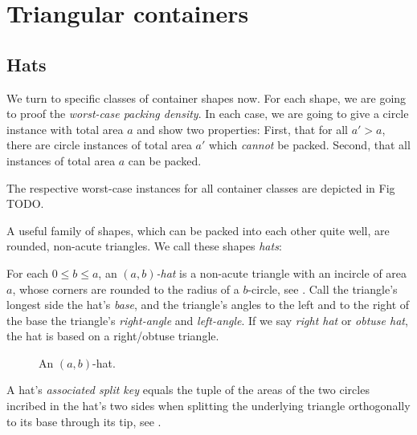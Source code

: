 \chapter{Triangular containers}

\section{Hats}

We turn to specific classes of container shapes now. For each shape, we are going to proof the \emph{worst-case packing density}. In each case, we are going to give a circle instance with total area $a$ and show two properties: First, that for all $a' > a$, there are circle instances of total area $a'$ which \emph{cannot} be packed. Second, that all instances of total area $a$ can be packed.

The respective worst-case instances for all container classes are depicted in Fig TODO.

A useful family of shapes, which can be packed into each other quite well, are rounded, non-acute triangles. We call these shapes \emph{hats}:

\begin{definition}
    For each $0 \le b \le a$, an \emph{$(a,b)$-hat} is a non-acute triangle with an incircle of area $a$, whose corners are rounded to the radius of a $b$-circle, see . Call the triangle's longest side the hat's \emph{base}, and the triangle's angles to the left and to the right of the base the triangle's \emph{right-angle} and \emph{left-angle}.
    If we say \emph{right hat} or \emph{obtuse hat}, the hat is based on a right/obtuse triangle.
\end{definition}

\begin{figure}[htbp!]
    \centering


    \caption{An $(a,b)$-hat.}
    \label{fig:hat}
\end{figure}

\begin{definition}\label{def:hat-split-key}
    A hat's \emph{associated split key} equals the tuple of the areas of the two circles incribed in the hat's two sides when splitting the underlying triangle orthogonally to its base through its tip, see .
\end{definition}

